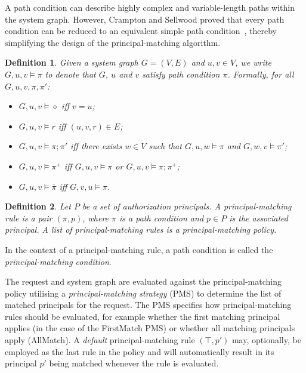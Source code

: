 \documentclass{article}
\newtheorem{definition}{Definition}
\newcommand{\comp}{\mathbin{;}}
\begin{document}
A path condition can describe highly complex and variable-length paths within the system graph.
However, Crampton and Sellwood proved that every path condition can be reduced to an equivalent simple path condition~\cite[\S{2.2}]{CramptonS14}, thereby simplifying the design of the principal-matching algorithm.

\begin{definition}\label{def:path-condition-semantics}
    Given a system graph $G = (V,E)$ and $u,v \in V$, we write $G,u,v \models \pi$ to denote that  $G$, $u$ and $v$ \emph{satisfy path condition} $\pi$.
    Formally, for all $G,u,v,\pi,\pi'$:
    \begin{itemize}
        \item $G,u,v \models \diamond$ iff $v = u$;
        \item $G,u,v \models r$ iff $(u,v,r) \in E$;
        \item $G,u,v \models \pi \comp \pi'$ iff there exists $w \in V$ such that $G,u,w \models \pi$ and $G,w,v \models \pi'$;
        \item $G,u,v \models \pi^+$ iff $G,u,v \models \pi$ or $G,u,v \models \pi \comp \pi^+$;
        \item $G,u,v \models \overline{\pi}$ iff $G,v,u \models \pi$.
    \end{itemize}
\end{definition}

\begin{definition}
    Let $P$ be a set of authorization principals.
    A \emph{principal-matching rule} is a pair $(\pi,p)$, where $\pi$ is a path condition and $p \in P$ is the associated principal.
    A list of principal-matching rules is a \emph{principal-matching policy}.
\end{definition}

In the context of a principal-matching rule, a path condition is called the \emph{principal-matching condition}.

The request and system graph are evaluated against the principal-matching policy utilising a \emph{principal-matching strategy} (PMS) to determine the list of matched principals for the request.
The PMS specifies how principal-matching rules should be evaluated, for example whether the first matching principal applies (in the case of the \textsf{FirstMatch} PMS) or whether all matching principals apply (\textsf{AllMatch}).
A \emph{default} principal-matching rule $(\top, p')$ may, optionally, be employed as the last rule in the policy and will automatically result in its principal $p'$ being matched whenever the rule is evaluated.
\end{document}
